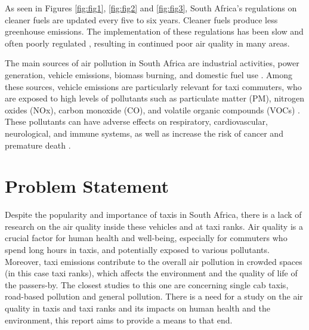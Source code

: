\noindent
As seen in Figures \ref{fig:fig1}, \ref{fig:fig2} and \ref{fig:fig3}, South Africa's regulations on cleaner fuels are updated every five to six years. Cleaner fuels produce less greenhouse emissions. The implementation of these regulations has been slow and often poorly regulated \cite{newcleanfuelstandards}, resulting in continued poor air quality in many areas.

\noindent
The main sources of air pollution in South Africa are industrial activities, power generation, vehicle emissions, biomass burning, and domestic fuel use \cite{Bylaws2023}. Among these sources, vehicle emissions are particularly relevant for taxi commuters, who are exposed to high levels of pollutants such as particulate matter (PM), nitrogen oxides (NOx), carbon monoxide (CO), and volatile organic compounds (VOCs) \cite{Venter2018}. These pollutants can have adverse effects on respiratory, cardiovascular, neurological, and immune systems, as well as increase the risk of cancer and premature death \cite{WHO2016}.


\section{Problem Statement}
Despite the popularity and importance of taxis in South Africa, there is a lack of research on the air quality inside these vehicles and at taxi ranks. 
Air quality is a crucial factor for human health and well-being, especially for commuters who spend long hours in taxis, and potentially exposed to various pollutants.
Moreover, taxi emissions contribute to the overall air pollution in crowded spaces (in this case taxi ranks), which affects the environment and the quality of life of the passers-by. The closest studies to this one are concerning single cab taxis\cite{insidetaxismall}, road-based pollution\cite{taxiNetwork} and general pollution\cite{Environmentalimpact}.
There is a need for a study on the air quality in taxis and taxi ranks and its impacts on human health and the environment, this report aims to provide a means to that end.

